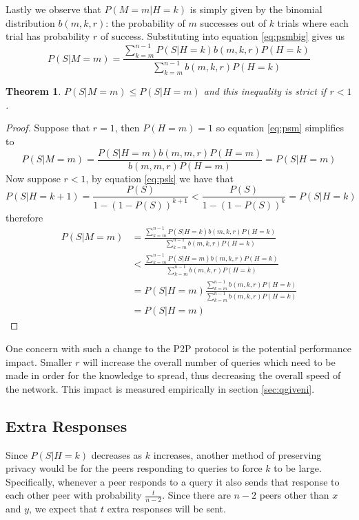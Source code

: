 \documentclass{article}
\newcommand{\eqnref}[1]{equation \eqref{eq:#1}}
\newcommand{\secref}[1]{section \ref{sec:#1}}
\newtheorem{theorem}{Theorem}
\begin{document}
Lastly we observe that $P(M=m|H=k)$ is simply given by the binomial
distribution $b(m,k,r)$: the probability of $m$ successes out of $k$ trials where
each trial has probability $r$ of success. Substituting into \eqnref{psmbig} gives us
\begin{equation}\label{eq:psm}
	P(S|M=m)=\frac{\sum_{k=m}^{n-1}P(S|H=k)b(m,k,r)P(H=k)}{\sum_{k=m}^{n-1}b(m,k,r)P(H=k)}
\end{equation}

\begin{theorem}\label{th:rbound}
	$P(S|M=m)\le P(S|H=m)$ and this inequality is strict if $r<1$.
\end{theorem}
\begin{proof}
	Suppose that $r=1$, then $P(H=m)=1$ so \eqnref{psm} simplifies to
	\begin{equation*}
		P(S|M=m)=\frac{P(S|H=m)b(m,m,r)P(H=m)}{b(m,m,r)P(H=m)}=P(S|H=m)
	\end{equation*}
	Now suppose $r<1$, by \eqnref{psk} we have that
	\begin{equation*}
		P(S|H=k+1)=\frac{P(S)}{1-(1-P(S))^{k+1}}<\frac{P(S)}{1-(1-P(S))^k}=P(S|H=k)
	\end{equation*}
	therefore
	\begin{align*}
		P(S|M=m)&=\frac{\sum_{k=m}^{n-1}P(S|H=k)b(m,k,r)P(H=k)}{\sum_{k=m}^{n-1}b(m,k,r)P(H=k)}\\
		&<\frac{\sum_{k=m}^{n-1}P(S|H=m)b(m,k,r)P(H=k)}{\sum_{k=m}^{n-1}b(m,k,r)P(H=k)}\\
		&=P(S|H=m)\frac{\sum_{k=m}^{n-1}b(m,k,r)P(H=k)}{\sum_{k=m}^{n-1}b(m,k,r)P(H=k)}\\
		&=P(S|H=m)
	\end{align*}
\end{proof}

One concern with such a change to the P2P protocol is the potential performance
impact. Smaller $r$ will increase the overall number of queries which need to be
made in order for the knowledge to spread, thus decreasing the overall speed of
the network. This impact is measured empirically in \secref{qgiveni}.

\subsection{Extra Responses}\label{sec:exre}

Since $P(S|H=k)$ decreases as $k$ increases, another method of
preserving privacy would be for the peers responding to queries to force $k$ to
be large. Specifically, whenever a peer responds to a query it also
sends that response to each other peer with probability
$\frac{t}{n-2}$. Since there are $n-2$ peers other than $x$ and $y$, we expect
that $t$ extra responses will be sent.
\end{document}
